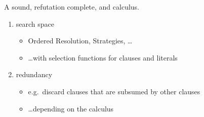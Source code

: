 \begin{goal}
A sound, refutation complete, and  calculus.
\begin{enumerate}
	\item<2->  search space
	\begin{itemize}
		\item<3-> Ordered Resolution, Strategies, \ldots
		\item<4-> \ldots with selection functions for clauses and literals
	\end{itemize}
	\item<5->  redundancy
	\begin{itemize}
		\item<6-> e.g.~discard clauses that are subsumed by other clauses
		\item<7-> \ldots depending on the calculus
	\end{itemize}
\end{enumerate}
\end{goal}